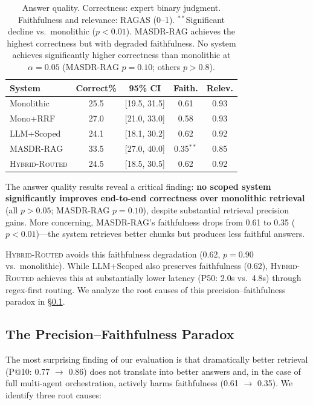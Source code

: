 \documentclass{article}
\newcommand{\systemname}{\textsc{MASDR-RAG}}
\newcommand{\hybridname}{\textsc{Hybrid-Routed}}
\newcommand{\sig}{$^{**}$}
\begin{document}
\begin{table}[H]
\centering
\footnotesize
\begin{tabular}{l c c c c}
\toprule
\textbf{System} & \textbf{Correct\%} & \textbf{95\% CI} & \textbf{Faith.} & \textbf{Relev.} \\
\midrule
Monolithic      & 25.5 & [19.5, 31.5] & 0.61 & 0.93 \\
Mono+RRF        & 27.0 & [21.0, 33.0] & 0.58 & 0.93 \\
LLM+Scoped      & 24.1 & [18.1, 30.2] & 0.62 & 0.92 \\
\systemname{}   & 33.5 & [27.0, 40.0] & 0.35\sig & 0.85 \\
\hybridname{}   & 24.5 & [18.5, 30.5] & 0.62 & 0.92 \\
\bottomrule
\end{tabular}
\caption{Answer quality. Correctness: expert binary judgment. Faithfulness and relevance: RAGAS (0--1). \sig{}Significant decline vs.\ monolithic ($p<0.01$). \systemname{} achieves the highest correctness but with degraded faithfulness. No system achieves significantly higher correctness than monolithic at $\alpha=0.05$ (\systemname{} $p=0.10$; others $p>0.8$).}
\label{tab:answer_quality}
\end{table}

The answer quality results reveal a critical finding: \textbf{no scoped system significantly improves end-to-end correctness over monolithic retrieval} (all $p > 0.05$; \systemname{} $p = 0.10$), despite substantial retrieval precision gains. More concerning, \systemname{}'s faithfulness drops from 0.61 to 0.35 ($p < 0.01$)---the system retrieves better chunks but produces less faithful answers.

\hybridname{} avoids this faithfulness degradation (0.62, $p = 0.90$ vs.\ monolithic). While LLM+Scoped also preserves faithfulness (0.62), \hybridname{} achieves this at substantially lower latency (P50: 2.0s vs.\ 4.8s) through regex-first routing. We analyze the root causes of this precision--faithfulness paradox in \S\ref{sec:paradox}.

\subsection{The Precision--Faithfulness Paradox}
\label{sec:paradox}

The most surprising finding of our evaluation is that dramatically better retrieval (P@10: 0.77 $\rightarrow$ 0.86) does not translate into better answers and, in the case of full multi-agent orchestration, actively harms faithfulness (0.61 $\rightarrow$ 0.35). We identify three root causes:
\end{document}

